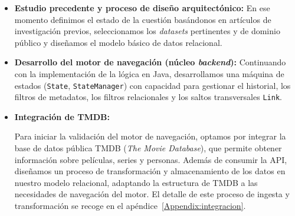 \begin{itemize}
\item \textbf{Estudio precedente y proceso de diseño arquitectónico:}
En ese momento definimos el estado de la cuestión basándonos en artículos de investigación previos,
seleccionamos los \textit{datasets} pertinentes y de dominio público y diseñamos el modelo básico de datos relacional.

\item \textbf{Desarrollo del motor de navegación (núcleo \textit{backend}):}
Continuando con la implementación de la lógica en Java, desarrollamos una máquina de estados
(\texttt{State}, \texttt{StateManager}) con capacidad para
gestionar el historial, los filtros de metadatos, los filtros relacionales y los saltos transversales \texttt{Link}.

\item \textbf{Integración de TMDB:}

Para iniciar la validación del motor de navegación, optamos por integrar la base de datos pública
TMDB (\textit{The Movie Database}), que permite obtener información sobre películas, series y personas.
Además de consumir la API, diseñamos un proceso de transformación y almacenamiento de los datos en nuestro modelo relacional,
adaptando la estructura de TMDB a las necesidades de navegación del motor. El detalle de este proceso de
ingesta y transformación se recoge en el apéndice~\ref{Appendix:integracion}.
\end{itemize}


